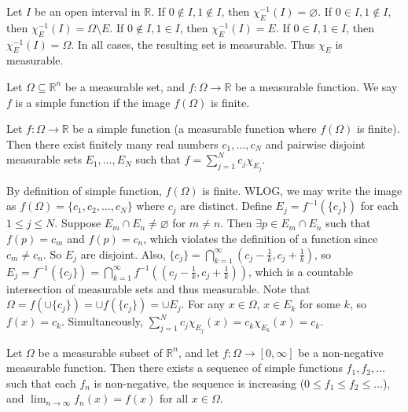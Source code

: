 \begin{pfbox}
    Let $I$ be an open interval in $\mathbb{R}$. 
    If $0 \notin I, 1 \notin I$, then $\chi_E^{-1}(I) = \varnothing$.
    If $0 \in I, 1 \notin I$, then $\chi_E^{-1}(I) = \Omega \setminus E$.
    If $0 \notin I, 1 \in I$, then $\chi_E^{-1}(I) = E$.
    If $0 \in I, 1 \in I$, then $\chi_E^{-1}(I) = \Omega$.
    In all cases, the resulting set is measurable. Thus $\chi_E$ is measurable.
\end{pfbox}




\begin{definition}
    Let $\Omega \subseteq \mathbb{R}^n$ be a measurable set, and $f:\Omega\rightarrow \mathbb{R}$ be a measurable function. We say $f$ is a simple function if the image $f(\Omega)$ is finite.
\end{definition}



\begin{proposition}
    Let $f: \Omega \rightarrow \mathbb{R}$ be a simple function (a measurable function where $f(\Omega)$ is finite). Then there exist finitely many real numbers $c_1, \dots, c_N$ and pairwise disjoint measurable sets $E_1, \dots, E_N$ such that $f = \displaystyle\sum_{j=1}^N c_j \chi_{E_j}$.
\end{proposition}

\begin{pfbox}
    By definition of simple function, $f(\Omega)$ is finite. 
    WLOG, we may write the image as $f(\Omega) = \{c_1, c_2, \dots, c_N\}$ where $c_j$ are distinct. Define $E_j = f^{-1}(\{c_j\})$ for each $1 \le j \le N$. 
    Suppose $E_m \cap E_n \neq \varnothing$ for $m \neq n$. Then $\exists p \in E_m \cap E_n$ such that $f(p) = c_m$ and $f(p) = c_n$, which violates the definition of a function since $c_m \neq c_n$. So $E_j$ are disjoint.
    Also, $\{c_j\} = \displaystyle\bigcap_{k=1}^\infty \left(c_j - \frac{1}{k}, c_j + \frac{1}{k}\right)$, so $E_j = f^{-1}(\{c_j\}) = \displaystyle\bigcap_{k=1}^\infty f^{-1}\left(\left(c_j - \frac{1}{k}, c_j + \frac{1}{k}\right)\right)$, which is a countable intersection of measurable sets and thus measurable.
    Note that $\Omega = f(\cup\{c_j\})=\cup f(\{c_j\})=\cup E_j.$ For any $x \in \Omega$, $x \in E_k$ for some $k$, so $f(x) = c_k$. Simultaneously, $\displaystyle\sum_{j=1}^N c_j \chi_{E_j}(x) = c_k \chi_{E_k}(x) = c_k$.
\end{pfbox}

\begin{theorem}
    Let $\Omega$ be a measurable subset of $\mathbb{R}^n$, and let $f:\Omega\rightarrow[0, \infty]$ be a non-negative measurable function. Then there exists a sequence of simple functions $f_1, f_2, \dots$ such that each $f_n$ is non-negative, the sequence is increasing ($0 \le f_1 \le f_2 \le \dots$), and $\displaystyle\lim_{n\to\infty} f_n(x) = f(x)$ for all $x \in \Omega$.
\end{theorem}

